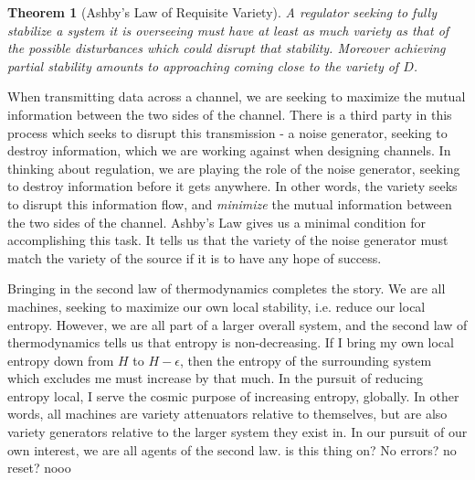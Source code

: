 \documentclass{article}
\theoremstyle{definition}
\theoremstyle{plain}
\newtheorem{theorem}{Theorem}[section]
\begin{document}
\begin{theorem}[Ashby's Law of Requisite Variety]
	A regulator seeking to fully stabilize a system it is overseeing must have at least as much variety as that of the possible disturbances which could disrupt that stability. Moreover achieving partial stability amounts to approaching coming close to the variety of $D$.
\end{theorem}
When transmitting data across a channel, we are seeking to maximize the mutual information between the two sides of the channel. There is a third party in this process which seeks to disrupt this transmission - a noise generator, seeking to destroy information, which we are working against when designing channels. In thinking about regulation, we are playing the role of the noise generator, seeking to destroy information before it gets anywhere. In other words, the variety seeks to disrupt this information flow, and \emph{minimize} the mutual information between the two sides of the channel. Ashby's Law gives us a minimal condition for accomplishing this task. It tells us that the variety of the noise generator must match the variety of the source if it is to have any hope of success. \par 
Bringing in the second law of thermodynamics completes the story. We are all machines, seeking to maximize our own local stability, i.e. reduce our local entropy. However, we are all part of a larger overall system, and the second law of thermodynamics tells us that entropy is non-decreasing. If I bring my own local entropy down from $H$ to $H-\epsilon$, then the entropy of the surrounding system which excludes me must increase by that much. In the pursuit of reducing entropy local, I serve the cosmic purpose of increasing entropy, globally. In other words, all machines are variety attenuators relative to themselves, but are also variety generators relative to the larger system they exist in. In our pursuit of our own interest, we are all agents of the second law. 
is this thing on? No errors? no reset? nooo
\end{document}
